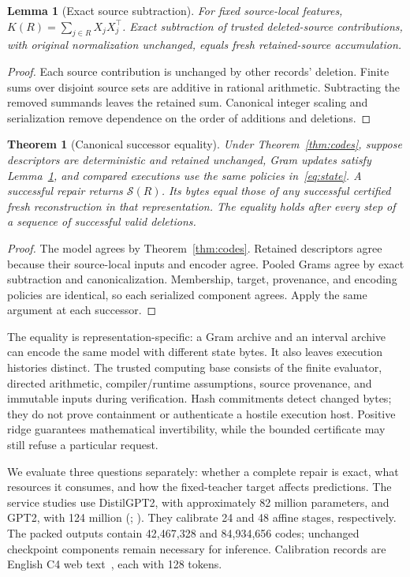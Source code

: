\documentclass[11pt,a4paper]{article}
\makeatletter
\def\section{\@startsection {section}{1}{\z@}{-2.0ex plus
    -0.5ex minus -.2ex}{1.5ex plus 0.3ex minus .2ex}{\large\bf\raggedright}}
\newtheorem{theorem}{Theorem}
\newtheorem{lemma}{Lemma}
\makeatother
\begin{document}
\begin{lemma}[Exact source subtraction]
\label{lem:subtract}
For fixed source-local features, $K(R)=\sum_{j\in R}X_jX_j^\top$.
Exact subtraction of trusted deleted-source contributions, with original
normalization unchanged, equals fresh retained-source accumulation.
\end{lemma}
\begin{proof}
Each source contribution is unchanged by other records' deletion. Finite sums
over disjoint source sets are additive in rational arithmetic. Subtracting the
removed summands leaves the retained sum. Canonical integer scaling and
serialization remove dependence on the order of additions and deletions.
\end{proof}

\begin{theorem}[Canonical successor equality]
\label{thm:state}
Under Theorem~\ref{thm:codes}, suppose descriptors are deterministic and retained
unchanged, Gram updates satisfy Lemma~\ref{lem:subtract}, and compared executions
use the same policies in~\eqref{eq:state}. A successful repair returns
$\mathcal S(R)$. Its bytes equal those of any successful certified fresh
reconstruction in that representation. The equality holds after every step of
a sequence of successful valid deletions.
\end{theorem}
\begin{proof}
The model agrees by Theorem~\ref{thm:codes}. Retained descriptors agree because
their source-local inputs and encoder agree. Pooled Grams agree by exact
subtraction and canonicalization. Membership, target, provenance, and encoding
policies are identical, so each serialized component agrees. Apply the same
argument at each successor.
\end{proof}

The equality is representation-specific: a Gram archive and an interval archive
can encode the same model with different state bytes. It also leaves execution
histories distinct. The trusted computing base consists of the finite evaluator,
directed arithmetic, compiler/runtime assumptions, source provenance, and
immutable inputs during verification. Hash commitments detect changed bytes;
they do not prove containment or authenticate a hostile execution host.
Positive ridge guarantees mathematical invertibility, while the bounded
certificate may still refuse a particular request.

\section{Evaluation design}
\label{sec:design}
We evaluate three questions separately: whether a complete repair is exact,
what resources it consumes, and how the fixed-teacher target affects predictions.
The service studies use DistilGPT2, with approximately 82 million parameters, and
GPT2, with 124 million (\citealp{distilgpt2}; \citealp{gpt2card}). They calibrate 24 and 48 affine
stages, respectively. The packed outputs contain 42,467,328 and 84,934,656 codes;
unchanged checkpoint components remain necessary for inference. Calibration
records are English C4 web text~\citep{c4}, each with 128 tokens.
\end{document}
